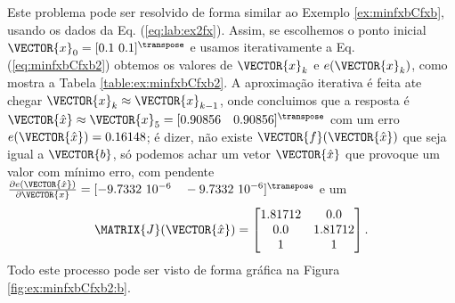 \begin{SolutionT}
\label{ex:minfxbCfxb2:sol1}
Este problema pode ser resolvido de forma similar ao Exemplo \ref{ex:minfxbCfxb},
usando os dados da Eq. (\ref{eq:lab:ex2fx}).
Assim, se escolhemos o ponto inicial $\VECTOR{x}_0=[0.1~0.1]^{\transpose}$ 
e usamos iterativamente a Eq. (\ref{eq:minfxbCfxb2}) obtemos os valores 
de $\VECTOR{x}_k$ e $e(\VECTOR{x}_k)$, como mostra a Tabela \ref{table:ex:minfxbCfxb2}.
A aproximação iterativa é feita ate chegar $\VECTOR{x}_k \approx \VECTOR{x}_{k-1}$,
onde concluimos que a resposta é $\VECTOR{\hat{x}}\approx \VECTOR{x}_5 =[0.90856\quad 0.90856]^{\transpose}$
com um erro $e(\VECTOR{\hat{x}})=0.16148$; é dizer, não existe $\VECTOR{f}(\VECTOR{\hat{x}})$
que seja igual a $\VECTOR{b}$, só podemos achar um vetor $\VECTOR{\hat{x}}$ 
que provoque um valor com mínimo erro, com pendente 
$\frac{\partial e(\VECTOR{\hat{x}})}{\partial \VECTOR{x} }=[-9.7332~10^{-6}\quad -9.7332~{10}^{-6}]^{\transpose}$
e um
\begin{equation}
\MATRIX{J}(\VECTOR{\hat{x}})=
\begin{bmatrix}
1.81712 & 0.0\\ 
0.0     & 1.81712\\
1       & 1
\end{bmatrix}.
\end{equation}
Todo este processo pode ser visto de forma gráfica na Figura \ref{fig:ex:minfxbCfxb2:b}.
\end{SolutionT}

